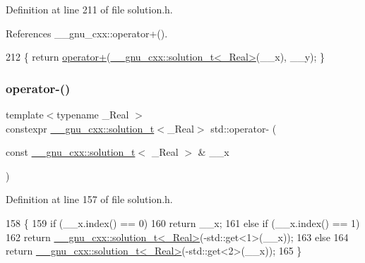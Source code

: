 Definition at line 211 of file solution.\+h.



References \+\_\+\+\_\+gnu\+\_\+cxx\+::operator+().


\begin{DoxyCode}
212     \{ \textcolor{keywordflow}{return} \hyperlink{namespacestd_aa471e6e6583f0beced389171490d8684}{operator+}(\hyperlink{namespace____gnu__cxx_ae20ea642de50eb361074c62676b0159c}{\_\_gnu\_cxx::solution\_t<\_Real>}(\_\_x), \_\_y); \}
\end{DoxyCode}
\mbox{\label{namespacestd_a6cd0256e6734f6ff66ad5e4f9d4f1741}} 
\subsubsection{\texorpdfstring{operator-\/()}{operator-()}\hspace{0.1cm}{\footnotesize\ttfamily [1/6]}}
{\footnotesize\ttfamily template$<$typename \+\_\+\+Real $>$ \\
constexpr \hyperlink{namespace____gnu__cxx_ae20ea642de50eb361074c62676b0159c}{\+\_\+\+\_\+gnu\+\_\+cxx\+::solution\+\_\+t}$<$\+\_\+\+Real$>$ std\+::operator-\/ (\begin{DoxyParamCaption}\item[{const \hyperlink{namespace____gnu__cxx_ae20ea642de50eb361074c62676b0159c}{\+\_\+\+\_\+gnu\+\_\+cxx\+::solution\+\_\+t}$<$ \+\_\+\+Real $>$ \&}]{\+\_\+\+\_\+x }\end{DoxyParamCaption})}



Definition at line 157 of file solution.\+h.


\begin{DoxyCode}
158     \{
159       \textcolor{keywordflow}{if} (\_\_x.index() == 0)
160         \textcolor{keywordflow}{return} \_\_x;
161       \textcolor{keywordflow}{else} \textcolor{keywordflow}{if} (\_\_x.index() == 1)
162         \textcolor{keywordflow}{return} \hyperlink{namespace____gnu__cxx_ae20ea642de50eb361074c62676b0159c}{\_\_gnu\_cxx::solution\_t<\_Real>}(-std::get<1>(\_\_x));
163       \textcolor{keywordflow}{else}
164         \textcolor{keywordflow}{return} \hyperlink{namespace____gnu__cxx_ae20ea642de50eb361074c62676b0159c}{\_\_gnu\_cxx::solution\_t<\_Real>}(-std::get<2>(\_\_x));
165     \}
\end{DoxyCode}
\mbox{\label{namespacestd_ad3462eddf6b43f6e2d87b7a5fa2a2307}} 
